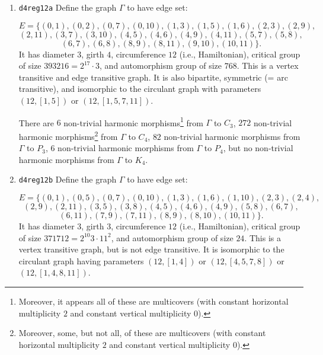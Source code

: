 \documentclass[12pt,letterpaper]{article}
\theoremstyle{definition}
\begin{document}
\begin{enumerate}
\item
 {\tt d4reg12a}\newline
  Define the graph  $\Gamma$
  to have edge set:

\[
E = \{
(0, 1), (0, 2), (0, 7), (0, 10), (1, 3), (1, 5), (1, 6), (2, 3), (2, 9),
\]
\[
(2, 11), (3, 7), (3, 10), (4, 5), (4, 6), (4, 9), (4, 11), (5, 7), (5, 8),
\]
\[
(6, 7), (6, 8), (8, 9), (8, 11), (9, 10), (10, 11)
\}.
\]
It has diameter $3$,
girth $4$, circumference $12$ (i.e., Hamiltonian),
critical group of size $393216 = 2^{17}\cdot 3$, 
and automorphism group of size $768$. This is a vertex transitive and
edge transitive graph. It is also bipartite, symmetric
(= arc transitive), and isomorphic to the circulant graph with
parameters $(12,[1,5])$ or $(12, [1, 5, 7, 11])$.

There are $6$ non-trivial harmonic
morphisms\footnote{Moreover, it appears all of these are multicovers
  (with constant horizontal multiplicity $2$ and constant vertical
  multiplicity $0$).}
from $\Gamma$ to $C_3$,
$272$ non-trivial harmonic
morphisms\footnote{Moreover, some, but not all, of these are multicovers
  (with constant horizontal multiplicity $2$ and constant vertical
  multiplicity $0$).} from $\Gamma$ to $C_4$,
$82$ non-trivial harmonic morphisms from $\Gamma$ to $P_3$,
$6$ non-trivial harmonic morphisms from $\Gamma$ to $P_4$,
but no non-trivial harmonic morphisms from $\Gamma$ to $K_4$.

\item
 {\tt d4reg12b}\newline
  Define the graph  $\Gamma$
  to have edge set:

\[
E = \{
(0, 1), (0, 5), (0, 7), (0, 10), (1, 3), (1, 6), (1, 10), (2, 3), (2, 4),
\]
\[
(2, 9), (2, 11), (3, 5), (3, 8), (4, 5), (4, 6), (4, 9), (5, 8), (6, 7),
\]
\[
(6, 11), (7, 9), (7, 11), (8, 9), (8, 10), (10, 11)
\}.
\]
It has diameter $3$,
girth $3$, circumference $12$ (i.e., Hamiltonian),
critical group of size $371712 = 2^{10} 3 \cdot 11^2$, 
and automorphism group of size $24$. This is a vertex transitive graph,
but is not edge transitive. It is isomorphic to the circulant graph
having parameters $(12,[1,4])$ or $(12, [4, 5, 7, 8])$ or
$(12, [1, 4, 8, 11])$.


\end{enumerate}
\end{document}
